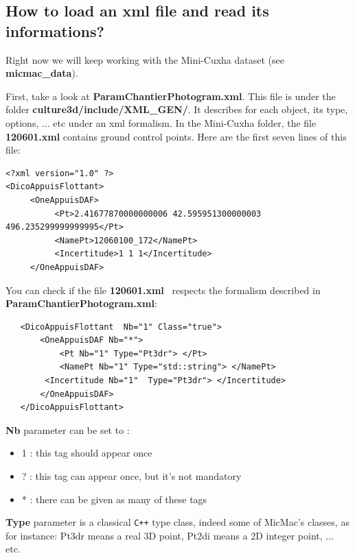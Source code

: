 \subsection{How to load an xml file and read its informations?}
Right now we will keep working with the Mini-Cuxha dataset (see \textbf{micmac\_data}). \newline

First, take a look at \og \textbf{ParamChantierPhotogram.xml}\fg. \newline
This file is under the folder \og\textbf{culture3d/include/XML\_GEN/}\fg. It describes for each object, its type, options, ... etc under an xml formalism. In the Mini-Cuxha folder, the file \textbf{120601.xml} contains ground control points. Here are the first seven lines of this file:
\begin{verbatim}
<?xml version="1.0" ?>
<DicoAppuisFlottant>
     <OneAppuisDAF>
          <Pt>2.41677870000000006 42.595951300000003 496.235299999999995</Pt>
          <NamePt>12060100_172</NamePt>
          <Incertitude>1 1 1</Incertitude>
     </OneAppuisDAF>
\end{verbatim}

You can check if the file \og \textbf{120601.xml} \fg\ respects the formalism described in \textbf{ParamChantierPhotogram.xml}:\newline
\begin{verbatim}
   <DicoAppuisFlottant  Nb="1" Class="true">
       <OneAppuisDAF Nb="*">
           <Pt Nb="1" Type="Pt3dr"> </Pt>
           <NamePt Nb="1" Type="std::string"> </NamePt>
        <Incertitude Nb="1"  Type="Pt3dr"> </Incertitude>
       </OneAppuisDAF>
   </DicoAppuisFlottant>
\end{verbatim}

\textbf{Nb} parameter can be set to :
\begin{itemize}
\item 1 : this tag should appear once
\item ? : this tag can appear once, but it's not mandatory
\item * : there can be given as many of these tags \newline
\end{itemize}

\textbf{Type} parameter is a classical \verb!C++! type class, indeed some of MicMac's classes, as for instance: Pt3dr means a real 3D point, Pt2di means a 2D integer point, ... etc. \newline


